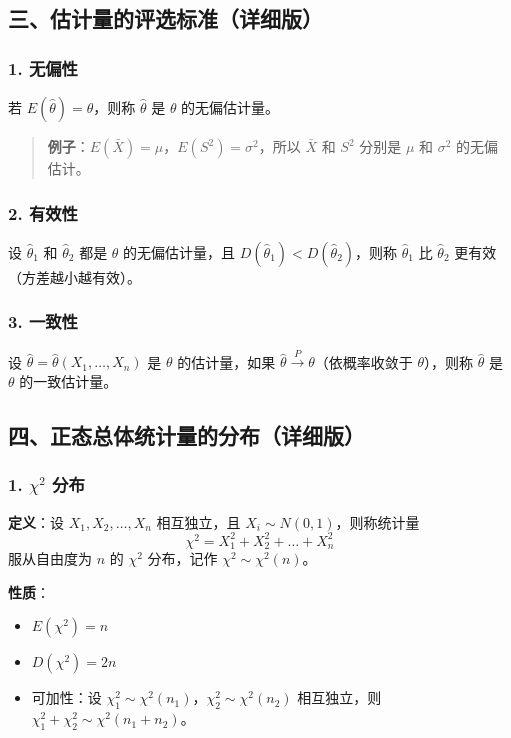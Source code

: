 \documentclass[12pt,a4paper]{ctexart}
\newenvironment{myquote}
  {\par\vspace{0.5em}\begin{quote}\sffamily\color{gray}}
  {\end{quote}\vspace{0.5em}}
\begin{document}
\subsection{三、估计量的评选标准（详细版）}

\subsubsection{1. 无偏性}
若 $E(\hat{\theta}) = \theta$，则称 $\hat{\theta}$ 是 $\theta$ 的无偏估计量。

\begin{myquote}
    \textbf{例子}：$E(\bar{X}) = \mu$，$E(S^2) = \sigma^2$，所以 $\bar{X}$ 和 $S^2$ 分别是 $\mu$ 和 $\sigma^2$ 的无偏估计。
\end{myquote}

\subsubsection{2. 有效性}
设 $\hat{\theta}_1$ 和 $\hat{\theta}_2$ 都是 $\theta$ 的无偏估计量，且 $D(\hat{\theta}_1) < D(\hat{\theta}_2)$，则称 $\hat{\theta}_1$ 比 $\hat{\theta}_2$ 更有效（方差越小越有效）。

\subsubsection{3. 一致性}
设 $\hat{\theta} = \hat{\theta}(X_1, \dots, X_n)$ 是 $\theta$ 的估计量，如果 $\hat{\theta} \xrightarrow{P} \theta$（依概率收敛于 $\theta$），则称 $\hat{\theta}$ 是 $\theta$ 的一致估计量。

\subsection{四、正态总体统计量的分布（详细版）}

\subsubsection{1. $\chi^2$ 分布}
\textbf{定义}：设 $X_1, X_2, \dots, X_n$ 相互独立，且 $X_i \sim N(0, 1)$，则称统计量
\[
    \chi^2 = X_1^2 + X_2^2 + \dots + X_n^2
\]
服从自由度为 $n$ 的 $\chi^2$ 分布，记作 $\chi^2 \sim \chi^2(n)$。

\textbf{性质}：
\begin{itemize}[noitemsep]
    \item $E(\chi^2) = n$
    \item $D(\chi^2) = 2n$
    \item 可加性：设 $\chi_1^2 \sim \chi^2(n_1)$，$\chi_2^2 \sim \chi^2(n_2)$ 相互独立，则 $\chi_1^2 + \chi_2^2 \sim \chi^2(n_1 + n_2)$。
\end{itemize}
\end{document}
